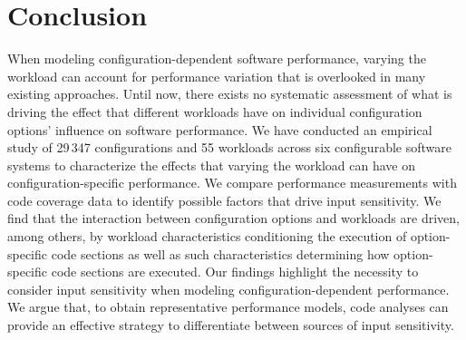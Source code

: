 \section{Conclusion}\label{sec:conclusion}
When modeling configuration-dependent software performance, varying the workload can account for performance variation that is overlooked in many existing approaches. Until now, there exists no systematic assessment of what is driving the effect that different workloads have on individual configuration options' influence on software performance.
We have conducted an empirical study of 29\,347 configurations and 55 workloads across six configurable software systems to characterize the effects that varying the workload can have on configuration-specific performance. We compare performance measurements with code coverage data to identify possible factors that drive input sensitivity. We find that the interaction between configuration options and workloads are driven, among others, by workload characteristics conditioning the execution of option-specific code sections as well as such characteristics determining how option-specific code sections are executed. 
Our findings highlight the necessity to consider input sensitivity when modeling configuration-dependent performance. We argue that, to obtain representative performance models, code analyses can provide an effective strategy to differentiate between sources of input sensitivity.
